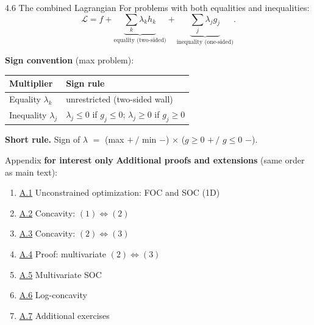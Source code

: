 \documentclass[11pt,aspectratio=169]{beamer}
\newcommand{\InterestOnly}{\textcolor{mAccent}{\textbf{for interest only}}}
\begin{document}
\begin{frame}{4.6 The combined Lagrangian}
  \small
  For problems with both equalities and inequalities:
  \[
    \mathcal{L} = f + \underbrace{\sum_k \lambda_k h_k}_{\text{equality (two-sided)}} + \underbrace{\sum_j \lambda_j g_j}_{\text{inequality (one-sided)}}.
  \]

  \textbf{Sign convention} (max problem):

  \begin{center}
    \begin{tabular}{@{}ll@{}}
      \toprule
      Multiplier & Sign rule \\
      \midrule
      Equality $\lambda_k$ & unrestricted (two-sided wall) \\
      Inequality $\lambda_j$ & $\lambda_j \leq 0$ if $g_j \leq 0$; $\lambda_j \geq 0$ if $g_j \geq 0$ \\
      \bottomrule
    \end{tabular}
  \end{center}

  \textbf{Short rule.} Sign of $\lambda$ $=$ (max $+\,/$ min $-$) $\times$ ($g\geq 0$ $+\,/$ $g\leq 0$ $-$).
\end{frame}

\appendix

\begin{frame}{Appendix \InterestOnly}
  \footnotesize
  \textbf{Additional proofs and extensions} (same order as main text):
  
  \begin{enumerate}
    \item \hyperlink{appendix:soc_1d}{A.1} Unconstrained optimization: FOC and SOC (1D)
    \item \hyperlink{appendix:concave_12}{A.2} Concavity: $(1)\Leftrightarrow(2)$
    \item \hyperlink{appendix:concave_23}{A.3} Concavity: $(2)\Leftrightarrow(3)$
    \item \hyperlink{appendix:multivariate_concave}{A.4} Proof: multivariate $(2)\Leftrightarrow(3)$
    \item \hyperlink{appendix:multivariate_soc}{A.5} Multivariate SOC
    \item \hyperlink{appendix:logconcave}{A.6} Log-concavity
    \item \hyperlink{appendix:exercises}{A.7} Additional exercises
  \end{enumerate}
\end{frame}
\end{document}
